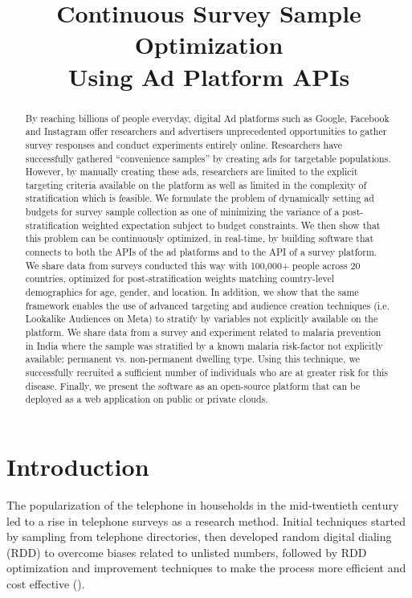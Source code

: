 \documentclass[a4paper,12pt]{article}
\title{Continuous Survey Sample Optimization \\ Using Ad Platform APIs}
\theoremstyle{proposition}
\begin{document}
\maketitle

\begin{abstract}
By reaching billions of people everyday, digital Ad platforms such as Google, Facebook and Instagram offer researchers and advertisers unprecedented opportunities to gather survey responses and conduct experiments entirely online. Researchers have successfully gathered “convenience samples” by creating ads for targetable populations. However, by manually creating these ads, researchers are limited to the explicit targeting criteria available on the platform as well as limited in the complexity of stratification which is feasible. We formulate the problem of dynamically setting ad budgets for survey sample collection as one of minimizing the variance of a post-stratification weighted expectation subject to budget constraints. We then show that this problem can be continuously optimized, in real-time, by building software that connects to both the APIs of the ad platforms and to the API of a survey platform. We share data from surveys conducted this way with 100,000+ people across 20 countries, optimized for post-stratification weights matching country-level demographics for age, gender, and location. In addition, we show that the same framework enables the use of advanced targeting and audience creation techniques (i.e. Lookalike Audiences on Meta) to stratify by variables not explicitly available on the platform. We share data from a survey and experiment related to malaria prevention in India where the sample was stratified by a known malaria risk-factor not explicitly available: permanent vs. non-permanent dwelling type. Using this technique, we successfully recruited a sufficient number of individuals who are at greater risk for this disease. Finally, we present the software as an open-source platform that can be deployed as a web application on public or private clouds.
\end{abstract}

\clearpage

\section{Introduction}

The popularization of the telephone in households in the mid-twentieth century led to a rise in telephone surveys as a research method. Initial techniques started by sampling from telephone directories, then developed random digital dialing (RDD) to overcome biases related to unlisted numbers, followed by RDD optimization and improvement techniques to make the process more efficient and cost effective (\cite{Cooper1964,Glasser1972,Sudman1973}).
\end{document}
